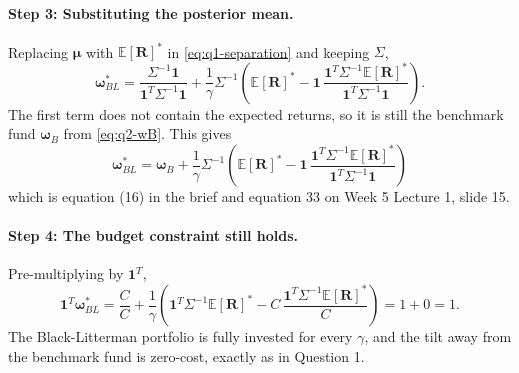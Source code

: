 \documentclass[11pt]{article}
\numberwithin{equation}{section}
\begin{document}
\paragraph{Step 3: Substituting the posterior mean.}
Replacing $\bm{\mu}$ with $\mathbb{E}[\bm{R}]^{*}$ in \eqref{eq:q1-separation} and keeping $\Sigma$,
\begin{equation*}
  \bm{\omega}^{*}_{BL} = \frac{\Sigma^{-1}\mathbf{1}}{\mathbf{1}^{T}\Sigma^{-1}\mathbf{1}} + \frac{1}{\gamma}\Sigma^{-1}\left(\mathbb{E}[\bm{R}]^{*} - \mathbf{1}\,\frac{\mathbf{1}^{T}\Sigma^{-1}\mathbb{E}[\bm{R}]^{*}}{\mathbf{1}^{T}\Sigma^{-1}\mathbf{1}}\right).
\end{equation*}
The first term does not contain the expected returns, so it is still the benchmark fund $\bm{\omega}_{B}$ from \eqref{eq:q2-wB}. This gives
\begin{equation}
  \boxed{\;\bm{\omega}^{*}_{BL} = \bm{\omega}_{B} + \frac{1}{\gamma}\Sigma^{-1}\left(\mathbb{E}[\bm{R}]^{*} - \mathbf{1}\,\frac{\mathbf{1}^{T}\Sigma^{-1}\mathbb{E}[\bm{R}]^{*}}{\mathbf{1}^{T}\Sigma^{-1}\mathbf{1}}\right)\;}
  \label{eq:q4-wBL}
\end{equation}
which is equation (16) in the brief and equation 33 on Week 5 Lecture 1, slide 15.

\paragraph{Step 4: The budget constraint still holds.}
Pre-multiplying by $\mathbf{1}^{T}$,
\begin{equation*}
  \mathbf{1}^{T}\bm{\omega}^{*}_{BL}
  = \frac{C}{C} + \frac{1}{\gamma}\left(\mathbf{1}^{T}\Sigma^{-1}\mathbb{E}[\bm{R}]^{*} - C\,\frac{\mathbf{1}^{T}\Sigma^{-1}\mathbb{E}[\bm{R}]^{*}}{C}\right)
  = 1 + 0 = 1.
\end{equation*}
The Black-Litterman portfolio is fully invested for every $\gamma$, and the tilt away from the benchmark fund is zero-cost, exactly as in Question 1.
\end{document}
